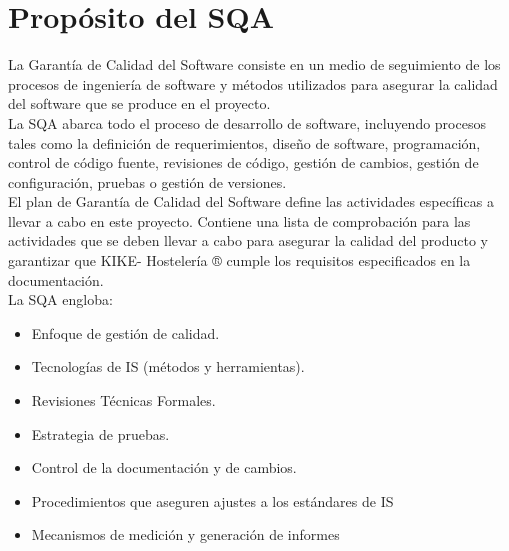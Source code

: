 \documentclass[spanish,a4paper,11pt, twoside]{report}	%
\begin{document}
\newpage
\mbox{}
\thispagestyle{empty}						%
\newpage


\tableofcontents 							%




\chapter{ Propósito del SQA}

	
	 La Garantía de Calidad del Software consiste en un medio de seguimiento de los procesos de ingeniería de software y métodos utilizados para asegurar la calidad del software que se produce en el proyecto.\\
	
	La SQA abarca todo el proceso de desarrollo de software, incluyendo procesos tales como la definición de requerimientos, diseño de software, programación, control de código fuente, revisiones de código, gestión de cambios, gestión de configuración, pruebas o gestión de versiones.\\
	
	El plan de Garantía de Calidad del Software define las actividades específicas a llevar a cabo en  este proyecto. Contiene una lista de comprobación para las actividades que se deben llevar a cabo para asegurar la calidad del producto y garantizar que KIKE- Hostelería ® cumple los requisitos especificados en la documentación.\\
	La SQA engloba:

\begin{itemize}
	\item Enfoque de gestión de calidad.
	\item Tecnologías de IS (métodos y herramientas).
	\item Revisiones Técnicas Formales.
	\item Estrategia de pruebas.
	\item Control de la documentación y de cambios.
	\item Procedimientos que aseguren ajustes a los estándares de IS
	\item Mecanismos de medición y generación de informes
\end{itemize}	
\end{document}
